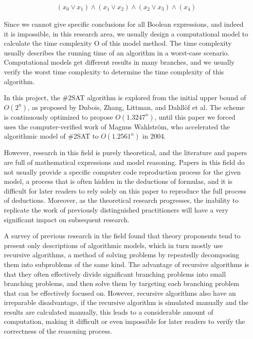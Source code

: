 \documentclass{sigchi}
\begin{document}
\begin{align*}  
\left ( x_{0}\vee x_{1} \right )\wedge \left ( x_{1}\vee x_{2} \right )\wedge \left ( x_{2}\vee  x_{3} \right )\wedge \left ( x_{4}\right )
\end{align*}


Since we cannot give specific conclusions for all Boolean expressions, and indeed it is impossible, in this research area, we usually design a computational model to calculate the time complexity O of this model method. The time complexity usually describes the running time of an algorithm in a worst-case scenario. Computational models get different results in many branches, and we usually verify the worst time complexity to determine the time complexity of this algorithm.

In this project, the \#2SAT algorithm is explored from the initial upper bound of $ O\left ( 2^{n} \right )$, as proposed by Dubois, Zhang, Littman, and Dahllöf\cite{10.1007/3-540-45655-4_57} et al. The scheme is continuously optimized to propose $ O\left ( 1.3247^{n} \right )$, until this paper we forced uses the computer-verified work of Magnus Wahlström, who accelerated the algorithmic model of \#2SAT to $ O\left ( 1.2561^{n} \right )$ in 2004\cite{10.1016/j.tcs.2004.10.037}.

However, research in this field is purely theoretical, and the literature and papers are full of mathematical expressions and model reasoning. Papers in this field do not usually provide a specific computer code reproduction process for the given model, a process that is often hidden in the deductions of formulas, and it is difficult for later readers to rely solely on this paper to reproduce the full process of deductions. Moreover, as the theoretical research progresses, the inability to replicate the work of previously distinguished practitioners will have a very significant impact on subsequent research.

A survey of previous research in the field found that theory proponents tend to present only descriptions of algorithmic models, which in turn mostly use recursive algorithms, a method of solving problems by repeatedly decomposing them into subproblems of the same kind. The advantage of recursive algorithms is that they often effectively divide significant branching problems into small branching problems, and then solve them by targeting each branching problem that can be effectively focused on. However, recursive algorithms also have an irreparable disadvantage, if the recursive algorithm is simulated manually and the results are calculated manually, this leads to a considerable amount of computation, making it difficult or even impossible for later readers to verify the correctness of the reasoning process.
\end{document}
